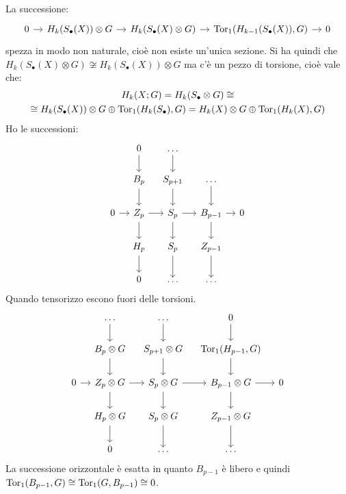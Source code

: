 \begin{theorem}
  La successione:
  \[
    \begin{tikzcd}[nodes = {column sep = 10pt}]
      0 \rar & H_k(S_\bullet(X)) \otimes G \rar & H_k(S_\bullet(X) \otimes G) \rar & \tor{H_{k-1}(S_\bullet(X)), G} \rar & 0
    \end{tikzcd}
  \]
  spezza in modo non naturale, cioè non esiste un'unica sezione. Si ha quindi che
  $ H_k(S_\bullet(X) \otimes G) \not \cong H_k(S_\bullet(X)) \otimes G $ ma c'è un pezzo
  di torsione, cioè vale che:
  \begin{gather*}
    H_k(X;G) = H_k(S_\bullet \otimes G) \cong \\
    \cong H_k(S_\bullet(X)) \otimes G \oplus \mathrm{Tor_1}( H_k(S_\bullet), G) = H_k(X) \otimes G \oplus \mathrm{Tor_1}( H_k(X), G)
  \end{gather*}
  Ho le successioni:
  \[
    \begin{tikzcd}[nodes = {column sep = 10pt}]
      {} & 0 \dar & \dots \dar & {} & {} \\
      {} & B_p \dar & S_{p+1} \dar & \dots \dar &  \\
      0 \rar & Z_p \dar \rar & S_p \dar \rar & B_{p-1} \rar \dar  & 0 \\
      {} & H_p \dar & S_p \dar & Z_{p-1} \dar & {} \\
      {} & 0 & \dots & \dots & {}
    \end{tikzcd}
  \]
  Quando tensorizzo escono fuori delle torsioni.
  \[
    \begin{tikzcd}[nodes = {column sep = 10pt}]
      {}     & \dots  \dar               & \dots \dar            & 0   \dar              & {} \\
      {}     & B_p \otimes G \dar      & S_{p+1} \otimes G\dar   & \tor{H_{p-1},G} \dar            &    \\
      0 \rar & Z_p \otimes G \dar \rar & S_p \otimes G \dar \rar & B_{p-1} \otimes G \rar \dar & 0  \\
      {}     & H_p \otimes G \dar      & S_p \otimes G \dar      & Z_{p-1} \otimes G \dar      & {} \\
      {}     & 0                 & \dots                 & \dots                 & {}
    \end{tikzcd}
  \]
  La successione orizzontale è esatta in quanto $ B_{p-1} $ è libero e quindi
  $ \mathrm{Tor_1}( B_{p-1}, G) \cong \mathrm{Tor_1}( G, B_{p-1}) \cong 0 $.
\end{theorem}

